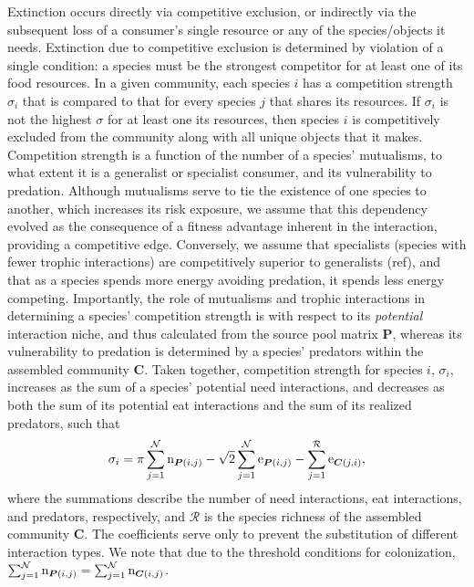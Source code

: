 \documentclass[twocolumn,preprintnumbers,amsmath,amssymb,superscriptaddress]{revtex4}
\newcommand{\rr}[1]{{\rm #1}}
\begin{document}
Extinction occurs directly via competitive exclusion, or indirectly via the subsequent loss of a consumer's single resource or any of the species/objects it needs.
Extinction due to competitive exclusion is determined by violation of a single condition: a species must be the strongest competitor for at least one of its food resources.
In a given community, each species $i$ has a competition strength $\sigma_i$ that is compared to that for every species $j$ that shares its resources.
If $\sigma_i$ is not the highest $\sigma$ for at least one its resources, then species $i$ is competitively excluded from the community along with all unique objects that it makes.
Competition strength is a function of the number of a species' mutualisms, to what extent it is a generalist or specialist consumer, and its vulnerability to predation.
Although mutualisms serve to tie the existence of one species to another, which increases its risk exposure, we assume that this dependency evolved as the consequence of a fitness advantage inherent in the interaction, providing a competitive edge.
Conversely, we assume that specialists (species with fewer trophic interactions) are competitively superior to generalists (ref), and that as a species spends more energy avoiding predation, it spends less energy competing.
Importantly, the role of mutualisms and trophic interactions in determining a species' competition strength is with respect to its \emph{potential} interaction niche, and thus calculated from the source pool matrix $\bm P$, whereas its vulnerability to predation is determined by a species' predators within the assembled community $\bm C$.
Taken together, competition strength for species $i$, $\sigma_i$, increases as the sum of a species' potential need interactions, and decreases as both the sum of its potential eat interactions and the sum of its realized predators, such that 
\begin{equation}
  \sigma_i = \pi \sum_{j=1}^\mathcal{N} \rr{n}_{{\bm P}(i,j)} - \sqrt{2}\sum_{j=1}^\mathcal{N} \rr{e}_{{\bm P}(i,j)} - \sum_{j=1}^\mathcal{R} \rr{e}_{{\bm C}(j,i)},
\end{equation}
where the summations describe the number of need interactions, eat interactions, and predators, respectively, and $\mathcal{R}$ is the species richness of the assembled community $\bm C$. 
The coefficients serve only to prevent the substitution of different interaction types.
We note that due to the threshold conditions for colonization, $\sum_{j=1}^\mathcal{N} \rr{n}_{{\bm P}(i,j)} = \sum_{j=1}^\mathcal{N} \rr{n}_{{\bm C}(i,j)}$.
\end{document}
